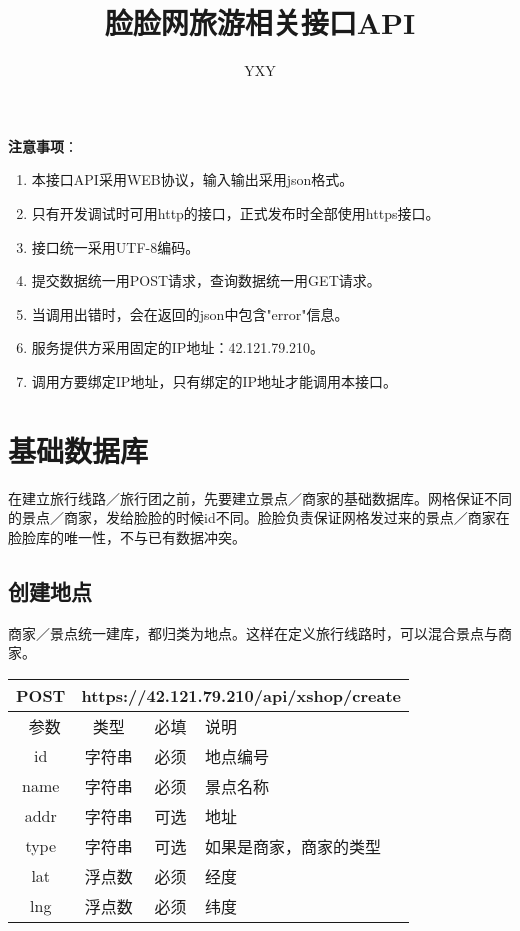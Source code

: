 \documentclass[cs4size]{ctexartutf8}
\author{YXY}
\title{脸脸网旅游相关接口API}
\begin{document}
 
\maketitle
\tableofcontents

\newpage

\textbf{注意事项}：
\begin{enumerate}
\item 本接口API采用WEB协议，输入输出采用json格式。
\item 只有开发调试时可用http的接口，正式发布时全部使用https接口。
\item 接口统一采用UTF-8编码。
\item 提交数据统一用POST请求，查询数据统一用GET请求。
\item 当调用出错时，会在返回的json中包含"error"信息。
\item 服务提供方采用固定的IP地址：42.121.79.210。
\item 调用方要绑定IP地址，只有绑定的IP地址才能调用本接口。
\end{enumerate}

\newpage

\section{基础数据库}

在建立旅行线路／旅行团之前，先要建立景点／商家的基础数据库。网格保证不同的景点／商家，发给脸脸的时候id不同。脸脸负责保证网格发过来的景点／商家在脸脸库的唯一性，不与已有数据冲突。

\subsection{创建地点}
商家／景点统一建库，都归类为地点。这样在定义旅行线路时，可以混合景点与商家。

\begin{table}[H]
   \begin{center}
\begin{tabular}{|c|c|c|p{12cm}|}
\hline
POST & \multicolumn{3}{|c|}{https://42.121.79.210/api/xshop/create} \\
\hline\hline
 \  参数  & 类型 & 必填 &  说明  \\
  \hline
 id  & 字符串 & 必须 &  地点编号\\
 \hline
 name  & 字符串 & 必须 &  景点名称\\
\hline
 addr  & 字符串 & 可选 &  地址\\
\hline
 type  & 字符串 & 可选 &  如果是商家，商家的类型\\
\hline
 lat  & 浮点数 & 必须 & 经度\\
\hline
 lng  &  浮点数 & 必须 & 纬度\\ 
\hline
\end{tabular}
   \end{center}
\end{table}
\end{document}
